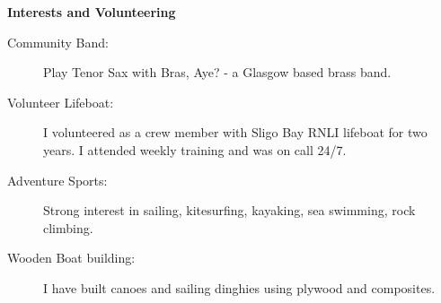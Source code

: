 \documentclass[letterpaper,11pt]{article}
\newcommand{\resheading}[1]{{\large \colorbox{mygrey}{\begin{minipage}{\textwidth}{\textbf{#1 \vphantom{p\^{E}}}}\end{minipage}}}}
\begin{document}
\resheading{Interests and Volunteering}
	\begin{description}
		\item[Community Band:] Play Tenor Sax with Bras, Aye? - a Glasgow based brass band.
		\item[Volunteer Lifeboat:] I volunteered as a crew member with Sligo Bay RNLI lifeboat for two years. I attended weekly training and was on call 24/7.
		\item[Adventure Sports:] Strong interest in sailing, kitesurfing, kayaking, sea swimming, rock climbing.
		\item[Wooden Boat building:] I have built canoes and sailing dinghies using plywood and composites.


	\end{description} %
\end{document}

